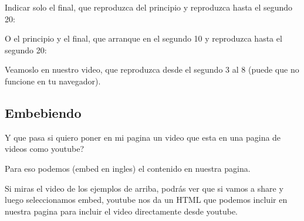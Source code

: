 \documentclass[letterpaper,10pt,spanish]{sphinxmanual}
\begin{document}
Indicar solo el final, que reproduzca del principio y reproduzca hasta el segundo 20:

%
\begin{sphinxVerbatim}[commandchars=\\\{\}]
\end{sphinxVerbatim}

O el principio y el final, que arranque en el segundo 10 y reproduzca hasta el segundo 20:

%
\begin{sphinxVerbatim}[commandchars=\\\{\}]
\end{sphinxVerbatim}

Veamoslo en nuestro video, que reproduzca desde el segundo 3 al 8 (puede que
no funcione en tu navegador).

%
\begin{sphinxVerbatim}[commandchars=\\\{\}]
   
\end{sphinxVerbatim}




\subsection{Embebiendo}
\label{\detokenize{audio-y-video:embebiendo}}
Y que pasa si quiero poner en mi pagina un video que esta en una pagina de
videos como youtube?

Para eso podemos  (embed en ingles) el contenido en nuestra pagina.

Si miras el video de los ejemplos de arriba, podrás ver que si vamos a share y
luego seleccionamos embed, youtube nos da un HTML que podemos incluir en
nuestra pagina para incluir el video directamente desde youtube.

%
\begin{sphinxVerbatim}[commandchars=\\\{\}]
  
\end{sphinxVerbatim}
\end{document}

